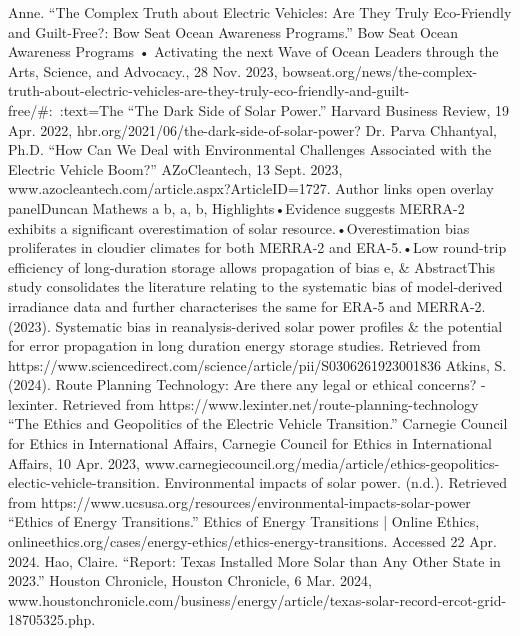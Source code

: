 \documentclass[10pt,twocolumn]{article}
\begin{document}
\begin{thebibliography}{100}

Anne. “The Complex Truth about Electric Vehicles: Are They Truly Eco-Friendly and Guilt-Free?: Bow Seat Ocean Awareness Programs.” Bow Seat Ocean Awareness Programs • Activating the next Wave of Ocean Leaders through the Arts, Science, and Advocacy., 28 Nov. 2023, bowseat.org/news/the-complex-truth-about-electric-vehicles-are-they-truly-eco-friendly-and-guilt-free/#:~:text=The%
“The Dark Side of Solar Power.” Harvard Business Review, 19 Apr. 2022, hbr.org/2021/06/the-dark-side-of-solar-power?
Dr. Parva Chhantyal, Ph.D. “How Can We Deal with Environmental Challenges Associated with the Electric Vehicle Boom?” AZoCleantech, 13 Sept. 2023, www.azocleantech.com/article.aspx?ArticleID=1727. 
Author links open overlay panelDuncan Mathews a b, a, b, Highlights•Evidence suggests MERRA-2 exhibits a significant overestimation of solar resource.•Overestimation bias proliferates in cloudier climates for both MERRA-2 and ERA-5.•Low round-trip efficiency of long-duration storage allows propagation of bias e, & AbstractThis study consolidates the literature relating to the systematic bias of model-derived irradiance data and further characterises the same for ERA-5 and MERRA-2. (2023). Systematic bias in reanalysis-derived solar power profiles & the potential for error propagation in long duration energy storage studies. Retrieved from https://www.sciencedirect.com/science/article/pii/S0306261923001836 
Atkins, S. (2024). Route Planning Technology: Are there any legal or ethical concerns? - lexinter. Retrieved from https://www.lexinter.net/route-planning-technology 
“The Ethics and Geopolitics of the Electric Vehicle Transition.” Carnegie Council for Ethics in International Affairs, Carnegie Council for Ethics in International Affairs, 10 Apr. 2023, www.carnegiecouncil.org/media/article/ethics-geopolitics-electic-vehicle-transition.
Environmental impacts of solar power. (n.d.). Retrieved from https://www.ucsusa.org/resources/environmental-impacts-solar-power 
“Ethics of Energy Transitions.” Ethics of Energy Transitions | Online Ethics, onlineethics.org/cases/energy-ethics/ethics-energy-transitions. Accessed 22 Apr. 2024. 
Hao, Claire. “Report: Texas Installed More Solar than Any Other State in 2023.” Houston Chronicle, Houston Chronicle, 6 Mar. 2024, www.houstonchronicle.com/business/energy/article/texas-solar-record-ercot-grid-18705325.php. 

\end{thebibliography}
\end{document}
